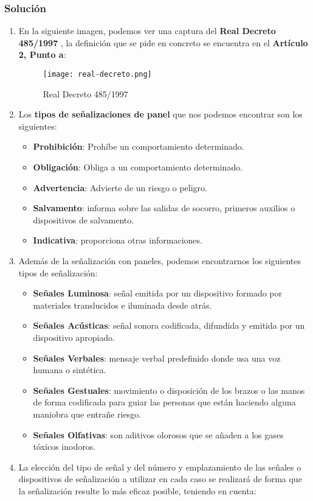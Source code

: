 \subsubsection{Solución}
\begin{enumerate}[label=\alph*.]
    \item En la siguiente imagen, podemos ver una captura del \textbf{Real Decreto 485/1997} \cite{rd485}, la definición que se pide en concreto se encuentra en el \textbf{Artículo 2, Punto a}:

    \begin{figure}[H]
        \centering
        \texttt{[image: real-decreto.png]}
        \caption{Real Decreto 485/1997}
    \end{figure}

    \item Los \textbf{tipos de señalizaciones de panel} que nos podemos encontrar son los siguientes:
    \begin{itemize}
        \item \textbf{Prohibición}: Prohíbe un comportamiento determinado.
        \item \textbf{Obligación}: Obliga a un comportamiento determinado.
        \item \textbf{Advertencia}: Advierte de un riesgo o peligro.
        \item \textbf{Salvamento}: informa sobre las salidas de socorro, primeros auxilios o dispositivos de salvamento.
        \item \textbf{Indicativa}: proporciona otras informaciones.
    \end{itemize}

    \item Además de la señalización con paneles, podemos encontrarnos los siguientes tipos de señalización:
    \begin{itemize}
    \item \textbf{Señales Luminosa}: señal emitida por un dispositivo formado por materiales translucidos e iluminada desde atrás.
    \item \textbf{Señales Acústicas}: señal sonora codificada, difundida y emitida por un dispositivo apropiado.
    \item \textbf{Señales Verbales}: mensaje verbal predefinido donde usa una voz humana o sintética.
    \item \textbf{Señales Gestuales}: movimiento o disposición de los brazos o las manos de forma codificada para guiar  las personas que están haciendo alguna maniobra que entrañe riesgo.
    \item \textbf{Señales Olfativas}: son aditivos olorosos que se añaden a los gases tóxicos inodoros.
\end{itemize}
    \item La elección del tipo de señal y del número y emplazamiento de las señales o dispositivos de señalización a utilizar en cada caso se realizará de forma que la señalización resulte lo más eficaz posible, teniendo en cuenta:


\end{enumerate}

